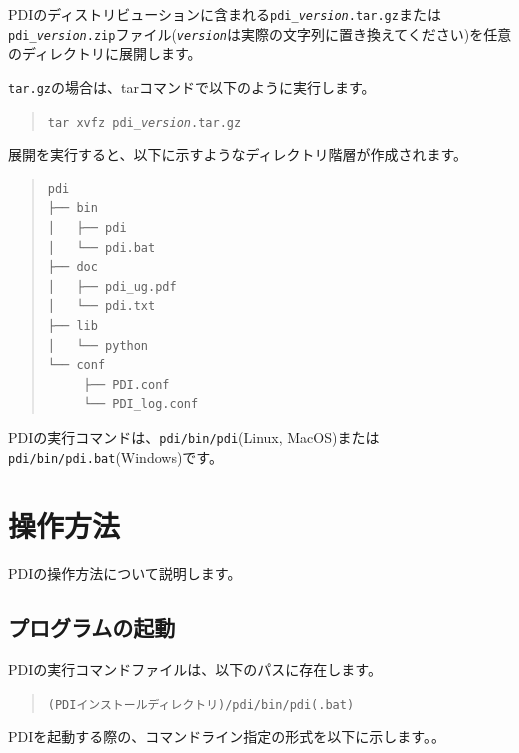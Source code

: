 \documentclass[a4paper,11pt]{jarticle}
\begin{document}
PDIのディストリビューションに含まれる{\tt pdi\_{\it version}.tar.gz}または{\tt pdi\_{\it version}.zip}ファイル({\tt\it version}は実際の文字列に置き換えてください)を任意のディレクトリに展開します。

{\tt tar.gz}の場合は、tarコマンドで以下のように実行します。

\begin{quote}
{\tt tar xvfz  pdi\_\textit{version}.tar.gz}
\end{quote}


展開を実行すると、以下に示すようなディレクトリ階層が作成されます。

\begin{quote}
\begin{verbatim}
pdi
├── bin
│   ├── pdi
│   └── pdi.bat
├── doc
│   ├── pdi_ug.pdf
│   └── pdi.txt
├── lib
│   └── python
└── conf
     ├── PDI.conf
     └── PDI_log.conf
\end{verbatim}
\end{quote}

PDIの実行コマンドは、{\tt pdi/bin/pdi}(Linux, MacOS)または{\tt pdi/bin/pdi.bat}(Windows)です。

\newpage
\section{操作方法}

PDIの操作方法について説明します。

\subsection{プログラムの起動}

PDIの実行コマンドファイルは、以下のパスに存在します。

\begin{quote}
{\tt (PDIインストールディレクトリ)/pdi/bin/pdi(.bat)}
\end{quote}

PDIを起動する際の、コマンドライン指定の形式を以下に示します。。
\end{document}
